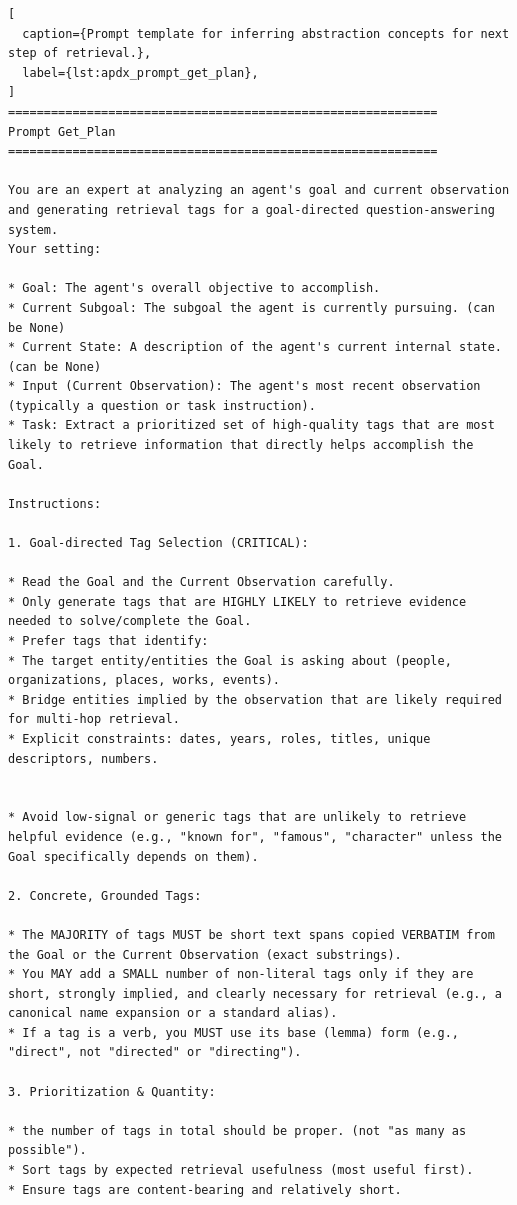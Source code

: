 \begin{lstlisting}[
  caption={Prompt template for inferring abstraction concepts for next step of retrieval.},
  label={lst:apdx_prompt_get_plan},
]
============================================================
Prompt Get_Plan
============================================================

You are an expert at analyzing an agent's goal and current observation and generating retrieval tags for a goal-directed question-answering system.
Your setting:

* Goal: The agent's overall objective to accomplish.
* Current Subgoal: The subgoal the agent is currently pursuing. (can be None)
* Current State: A description of the agent's current internal state. (can be None)
* Input (Current Observation): The agent's most recent observation (typically a question or task instruction).
* Task: Extract a prioritized set of high-quality tags that are most likely to retrieve information that directly helps accomplish the Goal.

Instructions:

1. Goal-directed Tag Selection (CRITICAL):

* Read the Goal and the Current Observation carefully.
* Only generate tags that are HIGHLY LIKELY to retrieve evidence needed to solve/complete the Goal.
* Prefer tags that identify:
* The target entity/entities the Goal is asking about (people, organizations, places, works, events).
* Bridge entities implied by the observation that are likely required for multi-hop retrieval.
* Explicit constraints: dates, years, roles, titles, unique descriptors, numbers.


* Avoid low-signal or generic tags that are unlikely to retrieve helpful evidence (e.g., "known for", "famous", "character" unless the Goal specifically depends on them).

2. Concrete, Grounded Tags:

* The MAJORITY of tags MUST be short text spans copied VERBATIM from the Goal or the Current Observation (exact substrings).
* You MAY add a SMALL number of non-literal tags only if they are short, strongly implied, and clearly necessary for retrieval (e.g., a canonical name expansion or a standard alias).
* If a tag is a verb, you MUST use its base (lemma) form (e.g., "direct", not "directed" or "directing").

3. Prioritization & Quantity:

* the number of tags in total should be proper. (not "as many as possible").
* Sort tags by expected retrieval usefulness (most useful first).
* Ensure tags are content-bearing and relatively short.


\end{lstlisting}
